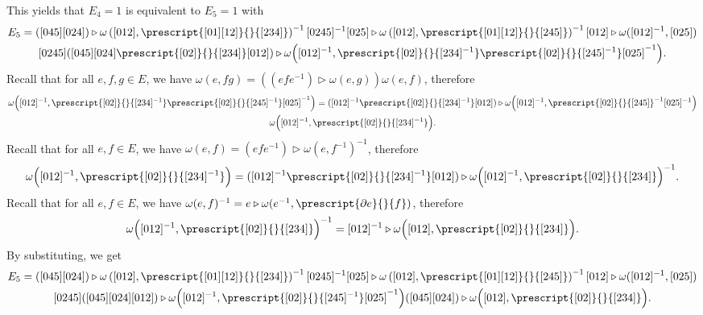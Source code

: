 \documentclass[a4paper, oneside]{amsart}
\numberwithin{equation}{subsection}
\theoremstyle{referencedlemma}
\theoremstyle{plain} %
\theoremstyle{remark}
\begin{document}
This yields that $E_4 = 1$ is equivalent to $E_5 = 1$ with 
\begin{multline*}
E_5 = ([045][024]) \triangleright \omega \left( [012], \prescript{[01][12]}{}{[234]} \right)^{-1}
 [0245]^{-1} [025]\triangleright \omega\left([012], \prescript{[01][12]}{}{[245]} \right)^{-1} [012] \triangleright \omega ([012]^{-1}, [025])\\
   [0245] ([045][024]\prescript{[02]}{}{[234]}[012])\triangleright \omega\Big ( [012]^{-1}, \prescript{[02]}{}{[234]^{-1}}\prescript{[02]}{}{[245]^{-1}}[025]^{-1}\Big ) .
\end{multline*}
Recall that for all $e,f,g \in E$, we have $\omega(e,fg) = \left((efe^{-1})\triangleright \omega(e,g)\right) \omega(e,f)$, therefore 
\begin{multline*}
\omega\Big ( [012]^{-1}, \prescript{[02]}{}{[234]^{-1}}\prescript{[02]}{}{[245]^{-1}}[025]^{-1}\Big )  = ([012]^{-1}\prescript{[02]}{}{[234]^{-1}}[012])\triangleright \omega\Big ([012]^{-1}, \prescript{[02]}{}{[245]}^{-1}[025]^{-1}\Big ) \\
\omega\Big ([012]^{-1}, \prescript{[02]}{}{[234]^{-1}}\Big ).
\end{multline*}
Recall that for all $e,f\in E$, we have $\omega(e,f) = (efe^{-1})\triangleright \omega(e,f^{-1})^{-1}$, therefore 
\begin{equation*}
    \omega\Big ([012]^{-1}, \prescript{[02]}{}{[234]^{-1}}\Big ) = ([012]^{-1}\prescript{[02]}{}{[234]^{-1}}[012])\triangleright \omega\Big ([012]^{-1}, \prescript{[02]}{}{[234]}\Big )^{-1}.
\end{equation*}
Recall that for all $e,f\in E$, we have $\omega(e,f)^{-1} = e\triangleright \omega(e^{-1}, \prescript{\partial e}{}{f})$, therefore
\begin{equation*}
    \omega\Big ([012]^{-1}, \prescript{[02]}{}{[234]}\Big )^{-1} = [012]^{-1}\triangleright \omega\Big ( [012], \prescript{[02]}{}{[234]}\Big ).
\end{equation*}
By substituting, we get
\begin{multline*}
E_5 = ([045][024]) \triangleright \omega \left( [012], \prescript{[01][12]}{}{[234]} \right)^{-1}
 [0245]^{-1} [025]\triangleright \omega\left([012], \prescript{[01][12]}{}{[245]} \right)^{-1} [012] \triangleright \omega ([012]^{-1}, [025])\\
   [0245] ([045][024][012])\triangleright \omega \Big ([012]^{-1}, \prescript{[02]}{}{[245]^{-1}}[025]^{-1}\Big ) ([045][024])\triangleright \omega\Big ( [012], \prescript{[02]}{}{[234]}\Big ) .
\end{multline*}
\end{document}
